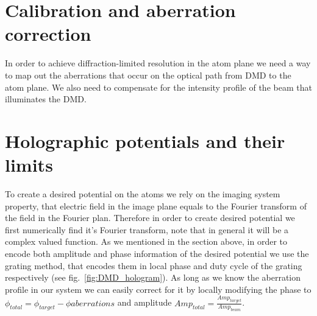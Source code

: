 \section{Calibration and aberration correction}
In order to achieve diffraction-limited resolution in the atom plane we need a way to map out the aberrations that occur on the optical path from DMD to the atom plane. We also need to compensate for the intensity profile of the beam that illuminates the DMD. 

\section{Holographic potentials and their limits}
To create a desired potential on the atoms we rely on the imaging system property, that electric field in the image plane equals to the Fourier transform of the field in the Fourier plan. Therefore in order to create desired potential we first numerically find it's Fourier transform, note that in general it will be a complex valued function. As we mentioned in the section above, in order to encode both amplitude and phase information of the desired potential we use the grating method, that encodes them in local phase and duty cycle of the grating respectively (see fig.~\ref{fig:DMD_hologram}). As long as we know the aberration profile in our system we can easily correct for it by locally modifying the phase to $\phi_{total} = \phi_{target} - \phi{aberrations}$ and amplitude $Amp_{total} = \frac{Amp_{target}}{Amp_{beam}}$.

